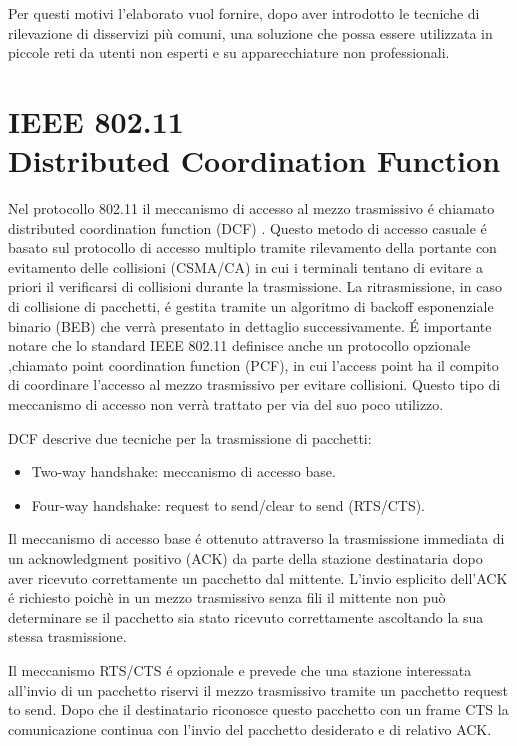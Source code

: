 Per questi motivi l'elaborato vuol fornire, dopo aver introdotto le tecniche di rilevazione di disservizi pi\`u comuni, una soluzione che possa essere utilizzata in piccole reti da utenti non esperti e su apparecchiature non professionali.

\section[IEEE 802.11 Distributed Coordination Function]{IEEE 802.11 \\Distributed Coordination Function}
Nel protocollo 802.11 il meccanismo di accesso al mezzo trasmissivo \'e chiamato distributed coordination function (DCF) \cite{ieee99}.
Questo metodo di accesso casuale \'e basato sul protocollo di accesso multiplo tramite rilevamento della portante con evitamento delle collisioni (CSMA/CA) in cui i terminali tentano di evitare a priori il verificarsi di collisioni durante la trasmissione.
La ritrasmissione, in caso di collisione di pacchetti, \'e gestita tramite un algoritmo di backoff esponenziale binario (BEB) che verr\`a presentato in dettaglio successivamente.
\'E importante notare che lo standard IEEE 802.11 definisce anche un  protocollo opzionale ,chiamato point coordination function (PCF), in cui l'access point ha il compito di coordinare l'accesso al mezzo trasmissivo per evitare collisioni. 
Questo tipo di meccanismo di accesso non verr\`a trattato per via del suo poco utilizzo.

DCF descrive due tecniche per la trasmissione di pacchetti:
\begin{itemize}
 \item Two-way handshake: meccanismo di accesso base.
 \item Four-way handshake: request to send/clear to send (RTS/CTS).
\end{itemize}

Il meccanismo di accesso base \'e ottenuto attraverso la trasmissione immediata di un acknowledgment positivo (ACK) da parte della stazione destinataria dopo aver ricevuto correttamente un pacchetto dal mittente.
L'invio esplicito dell'ACK \'e richiesto poich\`e in un mezzo trasmissivo senza fili il mittente non pu\`o determinare se il pacchetto sia stato ricevuto correttamente ascoltando la sua stessa trasmissione.

Il meccanismo RTS/CTS \'e opzionale e prevede che una stazione interessata all'invio di un pacchetto riservi il mezzo trasmissivo tramite un pacchetto request to send.
Dopo che il destinatario riconosce questo pacchetto con un frame CTS la comunicazione continua con l'invio del pacchetto desiderato e di relativo ACK.


